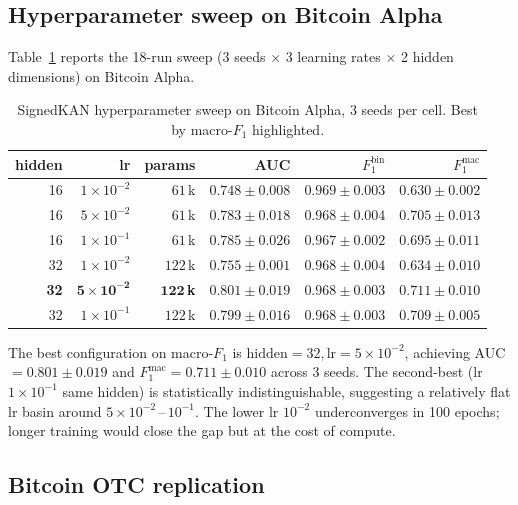 \subsection{Hyperparameter sweep on Bitcoin Alpha}

Table~\ref{tab:phase3-alpha} reports the 18-run sweep
(3 seeds $\times$ 3 learning rates $\times$ 2 hidden dimensions) on
Bitcoin Alpha.

\begin{table}[t]
\centering
\caption{SignedKAN hyperparameter sweep on Bitcoin Alpha,
3 seeds per cell. Best by macro-$F_1$ highlighted.}
\label{tab:phase3-alpha}
\setlength{\tabcolsep}{4pt}
\begin{tabular}{rrrrrr}
\toprule
hidden & lr & params & AUC & $F_{1}^{\mathrm{bin}}$ & $F_{1}^{\mathrm{mac}}$ \\
\midrule
16 & $1\!\times\!10^{-2}$ & $61$\,k & $0.748\pm0.008$ & $0.969\pm0.003$ & $0.630\pm0.002$ \\
16 & $5\!\times\!10^{-2}$ & $61$\,k & $0.783\pm0.018$ & $0.968\pm0.004$ & $0.705\pm0.013$ \\
16 & $1\!\times\!10^{-1}$ & $61$\,k & $0.785\pm0.026$ & $0.967\pm0.002$ & $0.695\pm0.011$ \\
32 & $1\!\times\!10^{-2}$ & $122$\,k & $0.755\pm0.001$ & $0.968\pm0.004$ & $0.634\pm0.010$ \\
\textbf{32} & $\boldsymbol{5\!\times\!10^{-2}}$ & $\boldsymbol{122}$\,\textbf{k} & $\boldsymbol{0.801\pm0.019}$ & $\boldsymbol{0.968\pm0.003}$ & $\boldsymbol{0.711\pm0.010}$ \\
32 & $1\!\times\!10^{-1}$ & $122$\,k & $0.799\pm0.016$ & $0.968\pm0.003$ & $0.709\pm0.005$ \\
\bottomrule
\end{tabular}
\end{table}

The best configuration on macro-$F_1$ is
$\text{hidden}=32, \text{lr}=5\!\times\!10^{-2}$, achieving
AUC $= 0.801 \pm 0.019$ and $F_{1}^{\mathrm{mac}} = 0.711 \pm 0.010$
across 3 seeds. The second-best (lr $1\!\times\!10^{-1}$ same hidden)
is statistically indistinguishable, suggesting a relatively flat lr
basin around $5\!\times\!10^{-2}\,\text{--}\,10^{-1}$. The lower lr
$10^{-2}$ underconverges in 100 epochs; longer training would close
the gap but at the cost of compute.

\subsection{Bitcoin OTC replication}

